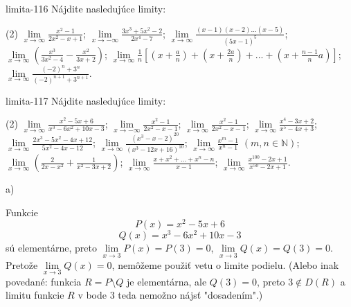 \begin{defproblem}{limita-116}
Nájdite nasledujúce limity:
\begin{tasks}(2)
    \task $\lim\limits_{{x \to \infty}} \frac{x^2-1}{2x^2-x+1}$;
    \task $\lim\limits_{{x \to -\infty}} \frac{3x^3+5x^2-2}{2x^4-7}$;
    \task $\lim\limits_{{x \to \infty}} \frac{(x-1)(x-2)...(x-5)}{(5x-1)^5}$;
    \task $\lim\limits_{{x \to \infty}} (\frac{x^3}{3x^2-4}-\frac{x^2}{3x+2})$;
    \task* $\lim\limits_{{x \to \infty}} \frac{1}{n}[(x+\frac{a}{n})+(x+\frac{2a}{n})+...+(x+\frac{n-1}{n}a)]$;
    \task $\lim\limits_{{x \to \infty}} \frac{(-2)^n+3^n}{(-2)^{n+1}+3^{n+1}}$.
\end{tasks}
\end{defproblem}

\begin{defproblem}{limita-117}
Nájdite nasledujúce limity:

\begin{tasks}(2)
    \task $\lim\limits_{{x \to \infty}} \frac{x^2-5x+6}{x^3-6x^2+10x-3}$;
    \task $\lim\limits_{{x \to -\infty}} \frac{x^2-1}{2x^2-x-1}$;
    \task $\lim\limits_{{x \to \infty}} \frac{x^2-1}{2x^2-x-1}$;
    \task $\lim\limits_{{x \to \infty}} \frac{x^4-3x+2}{x^5-4x+3}$;
    \task $\lim\limits_{{x \to \infty}} \frac{2x^3-5x^2-4x+12}{5x^2-4x-12}$;
    \task $\lim\limits_{{x \to \infty}} \frac{(x^3-x-2)^{20}}{(x^3-12x+16)^{10}}$;
    \task $\lim\limits_{{x \to \infty}} \frac{x^m-1}{x^n-1}$ $(m,n \in \mathbb{N})$;
    \task $\lim\limits_{{x \to \infty}} (\frac{2}{2x-x^2}+\frac{1}{x^2-3x+2})$;
    \task $\lim\limits_{{x \to \infty}} \frac{x+x^2+...+x^n-n}{x-1}$;
    \task $\lim\limits_{{x \to \infty}} \frac{x^{100}-2x+1}{x^{50}-2x+1}$.
\end{tasks}
\begin{solution}
    a)

    Funkcie
    \[
        P(x) = x^2 - 5x + 6
    \]
    \[
        Q(x) = x^3 - 6x^2 + 10x - 3
    \]
    sú elementárne, preto $\lim\limits_{x \to 3} P(x) = P(3) = 0$, $\lim\limits_{x
    \to 3} Q(x) = Q(3) = 0$. Pretože $\lim\limits_{x \to 3} Q(x) = 0$,
    nemôžeme použiť vetu o limite podielu. (Alebo inak povedané: funkcia $R = P
    \setminus Q$ je elementárna, ale $Q(3) = 0$, preto $3 \notin D(R)$ a limitu
    funkcie $R$ v bode $3$ teda nemožno nájsť "dosadením".)


\end{solution}
\end{defproblem}
